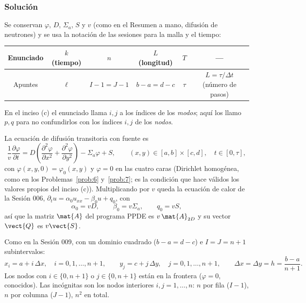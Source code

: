 \subsubsection*{Solución}
Se conservan $\varphi$, $D$, $\Sigma_a$, $S$ y $v$ (como en el Resumen a mano, difusión de neutrones)
y se usa la notación de las sesiones para la malla y el tiempo:
\begin{center}
\begin{tabular}{|c|c|c|c|c|c|}
	\hline
	Enunciado & $k$ (tiempo) & $n$ & $L$ (longitud) & $T$ & --- \\
	\hline
	Apuntes   & $\ell$ & $I-1 = J-1$ & $b-a = d-c$ & $\tau$ & $L = \tau/\Delta t$ (número de pasos) \\
	\hline
\end{tabular}
\end{center}
En el inciso (c) el enunciado llama $i, j$ a los índices de los \emph{modos}; aquí los llamo $p, q$ para no
confundirlos con los índices $i, j$ de los \emph{nodos}.

La ecuación de difusión transitoria con fuente es
\[
  \frac1v\frac{\partial\varphi}{\partial t}
  = D\left(\frac{\partial^2\varphi}{\partial x^2} + \frac{\partial^2\varphi}{\partial y^2}\right)
  - \Sigma_a\varphi + S,
  \qquad (x, y)\in[a, b]\times[c, d],\quad t\in[0, \tau],
\]
con $\varphi(x, y, 0) = \varphi_0(x, y)$ y $\varphi = 0$ en las cuatro caras (Dirichlet homogénea, como en
los Problemas~\ref{prob:6} y~\ref{prob:7}; es la condición que hace válidos los valores propios del inciso (c)).
Multiplicando por $v$ queda la ecuación de calor de la Sesión 006,
$\partial_t u = \alpha_0 u_{xx} - \beta_0 u + q_0$, con
\[
  \alpha_0 = vD, \qquad \beta_0 = v\Sigma_a, \qquad q_0 = vS ,
\]
así que la matriz $\mat{A}$ del programa PPDE es $v\,\mat{A}_{2D}$ y su vector $\vect{Q}$ es $v\vect{S}$.


Como en la Sesión 009, con un dominio cuadrado ($b - a = d - c$) e $I = J = n+1$ subintervalos:
\[
  x_i = a + i\,\Delta x,\quad i = 0, 1, \dots, n+1, \qquad
  y_j = c + j\,\Delta y,\quad j = 0, 1, \dots, n+1, \qquad
  \Delta x = \Delta y = h = \frac{b - a}{n+1}.
\]
Los nodos con $i\in\{0, n+1\}$ o $j\in\{0, n+1\}$ están en la frontera ($\varphi = 0$, conocidos). Las
incógnitas son los nodos interiores $i, j = 1, \dots, n$: $n$ por fila ($I-1$), $n$ por columna ($J-1$),
$n^2$ en total.

